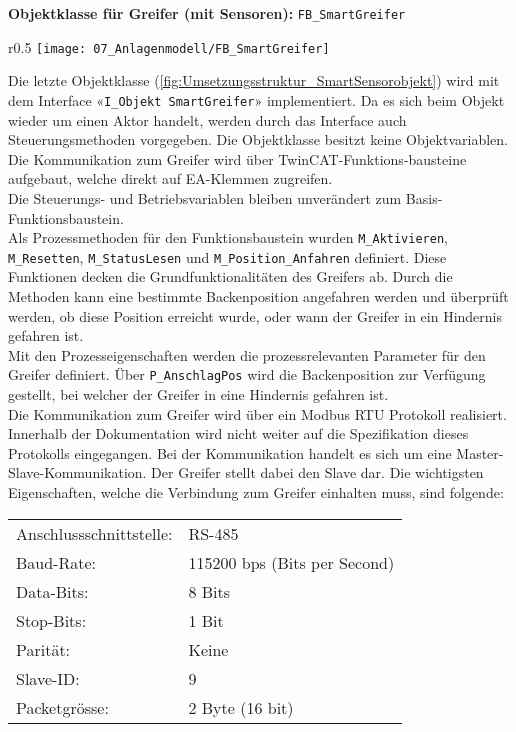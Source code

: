 		\newpage
		
		\textbf{Objektklasse für Greifer (mit Sensoren):} \verb|FB_SmartGreifer|
		\vspace{2mm}
		\vspace{-10mm}  
		\\
		\begin{wrapfigure}{r}{0.5\textwidth}
			\centering
			\texttt{[image: 07\_Anlagenmodell/FB\_SmartGreifer]}
			\captionsetup{justification=centering}
			\caption{Umsetzungsstruktur von Greifer-Objekt}
			\label{fig:Umsetzungsstruktur_SmartSensorobjekt}
		\end{wrapfigure} \par
		Die letzte Objektklasse (\ref{fig:Umsetzungsstruktur_SmartSensorobjekt}) wird mit dem Interface «\verb|I_Objekt SmartGreifer|» implementiert. Da es sich beim Objekt wieder um einen Aktor handelt, werden durch das Interface auch Steuerungsmethoden vorgegeben. Die Objektklasse besitzt keine Objektvariablen. Die Kommunikation zum Greifer wird über TwinCAT-Funktions-bausteine aufgebaut, welche direkt auf EA-Klemmen zugreifen. 
		\\
		Die Steuerungs- und Betriebsvariablen bleiben unverändert zum Basis-Funktionsbaustein.
		\\
		Als Prozessmethoden für den Funktionsbaustein wurden \verb|M_Aktivieren|, \verb|M_Resetten|, \verb|M_StatusLesen|
		und \verb|M_Position_Anfahren| definiert. Diese Funktionen decken die Grundfunktionalitäten des Greifers ab. Durch die Methoden kann eine bestimmte Backenposition angefahren werden und überprüft werden, ob diese Position erreicht wurde, oder wann der Greifer in ein Hindernis gefahren ist.
		\\
		Mit den Prozesseigenschaften werden die prozessrelevanten Parameter für den Greifer definiert. Über \verb|P_AnschlagPos|  wird die Backenposition zur Verfügung gestellt, bei welcher der Greifer in eine Hindernis gefahren ist. 
		\\
		Die Kommunikation zum Greifer wird über ein Modbus RTU Protokoll realisiert. Innerhalb der Dokumentation wird nicht weiter auf die Spezifikation dieses Protokolls eingegangen. Bei der Kommunikation handelt es sich um eine Master-Slave-Kommunikation. Der Greifer stellt dabei den Slave dar. Die wichtigsten Eigenschaften, welche die Verbindung zum Greifer einhalten muss, sind folgende:
		
		\begin{tabularx}{\textwidth}{@{}>{}p{13em} X@{}}
			Anschlussschnittstelle: & 
			RS-485
			\\
			Baud-Rate: & 
			115200 bps (Bits per Second)
			\\
			Data-Bits: & 
			8 Bits 
			\\
			Stop-Bits: & 
			1 Bit 
			\\
			Parität: & 
			Keine
			\\
			Slave-ID: & 
			9
			\\
			Packetgrösse: & 
			2 Byte (16 bit)
			\\
		\end{tabularx} \vspace{3mm} 
		
